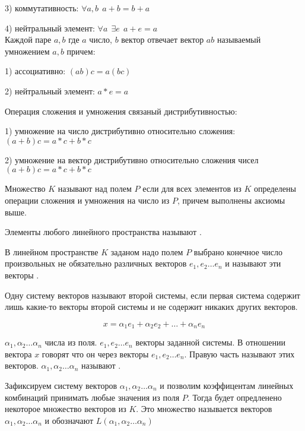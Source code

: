 3) коммутативность: $\forall a,b ~~ a+b = b+a$

4) нейтральный элемент: $\forall a ~~ \exists e ~~ a+e = a$\\

  Каждой паре $a,b$ где $a$ число, $b$ вектор отвечает вектор $ab$ называемый
умножением $a,b$ причем:

1) ассоциативно: $(ab)c = a(bc)$

2) нейтральный элемент: $a*e = a$

  Операция сложения и умножения связаный дистрибутивностью:

1) умножение на число дистрибутивно относительно сложения:$(a + b)c = a*c + b*c$

2) умножение на вектор дистрибутивно относительно сложения чисел
$(a + b)c = a*c + b*c$\\

\begin{defin}
  Множество $K$ называют  над полем $P$ если для всех
элементов из $K$ определены операции сложения и умножения на число из $P$,
причем выполнены аксиомы выше.
\end{defin}

  Элементы любого линейного пространства называют .

\begin{defin}
  В линейном пространстве $K$ заданом надо полем $P$ выбрано конечное число
произвольных не обязательно различных векторов $e_1, e_2 \ldots e_n$ и называют
эти векторы .
\end{defin}

\begin{defin}
  Одну систему векторов называют  второй системы, если первая
система содержит лишь какие-то векторы второй системы и не содержит никаких
других векторов.
\end{defin}

\[
  x = \alpha_1 e_1 + \alpha_2 e_2 + \ldots + \alpha_n e_n
\]

  $\alpha_1, \alpha_2 \ldots \alpha_n$ числа из поля. $e_1, e_2 \ldots e_n$
векторы заданной системы.  В отношении вектора $x$ говорят что он
 через векторы $e_1, e_2 \ldots e_n$. Правую часть
называют  этих векторов.
$\alpha_1, \alpha_2 \ldots \alpha_n$ называют
.

\begin{defin}
  Зафиксируем систему векторов $\alpha_1, \alpha_2 \ldots \alpha_n$ и позволим
коэффицентам линейных комбинаций принимать любые значения из поля $P$. Тогда
будет опредленено некоторое множество векторов из $K$. Это множество называется
 векторов $\alpha_1, \alpha_2 \ldots \alpha_n$ и
обозначают $L(\alpha_1, \alpha_2 \ldots \alpha_n)$
\end{defin}


